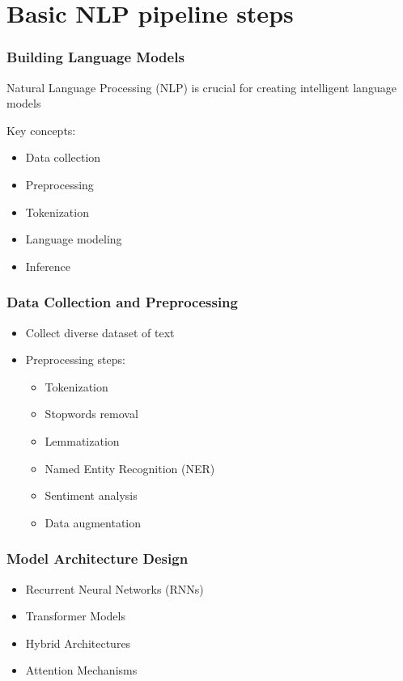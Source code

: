\documentclass{beamer}
\begin{document}
\section{Basic NLP pipeline steps}

\begin{frame}
\frametitle{Building Language Models}
Natural Language Processing (NLP) is crucial for creating intelligent language models

Key concepts:
    \begin{itemize}
        \item Data collection
        \item Preprocessing
        \item Tokenization
        \item Language modeling
        \item Inference
    \end{itemize}
\end{frame}


\begin{frame}
\frametitle{Data Collection and Preprocessing}
\begin{itemize}
    \item Collect diverse dataset of text
    \item Preprocessing steps:
    \begin{itemize}
        \item Tokenization
        \item Stopwords removal
        \item Lemmatization
        \item Named Entity Recognition (NER)
        \item Sentiment analysis
        \item Data augmentation
    \end{itemize}
\end{itemize}
\end{frame}

\begin{frame}
\frametitle{Model Architecture Design}
\begin{itemize}
    \item Recurrent Neural Networks (RNNs)
    \item Transformer Models
    \item Hybrid Architectures
    \item Attention Mechanisms
\end{itemize}
\end{frame}
\end{document}
